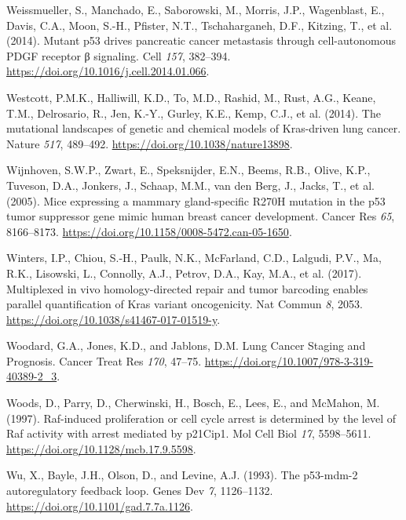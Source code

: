 \begin{CSLReferences}{0}{0}
\leavevmode{}%
Weissmueller, S., Manchado, E., Saborowski, M., Morris, J.P., Wagenblast, E., Davis, C.A., Moon, S.-H., Pfister, N.T., Tschaharganeh, D.F., Kitzing, T., et al. (2014). Mutant p53 drives pancreatic cancer metastasis through cell-autonomous PDGF receptor β signaling. Cell \emph{157}, 382--394. \url{https://doi.org/10.1016/j.cell.2014.01.066}.

\leavevmode{}%
Westcott, P.M.K., Halliwill, K.D., To, M.D., Rashid, M., Rust, A.G., Keane, T.M., Delrosario, R., Jen, K.-Y., Gurley, K.E., Kemp, C.J., et al. (2014). The mutational landscapes of genetic and chemical models of Kras-driven lung cancer. Nature \emph{517}, 489--492. \url{https://doi.org/10.1038/nature13898}.

\leavevmode{}%
Wijnhoven, S.W.P., Zwart, E., Speksnijder, E.N., Beems, R.B., Olive, K.P., Tuveson, D.A., Jonkers, J., Schaap, M.M., van den Berg, J., Jacks, T., et al. (2005). Mice expressing a mammary gland-specific R270H mutation in the p53 tumor suppressor gene mimic human breast cancer development. Cancer Res \emph{65}, 8166--8173. \url{https://doi.org/10.1158/0008-5472.can-05-1650}.

\leavevmode{}%
Winters, I.P., Chiou, S.-H., Paulk, N.K., McFarland, C.D., Lalgudi, P.V., Ma, R.K., Lisowski, L., Connolly, A.J., Petrov, D.A., Kay, M.A., et al. (2017). Multiplexed in vivo homology-directed repair and tumor barcoding enables parallel quantification of Kras variant oncogenicity. Nat Commun \emph{8}, 2053. \url{https://doi.org/10.1038/s41467-017-01519-y}.

\leavevmode{}%
Woodard, G.A., Jones, K.D., and Jablons, D.M. Lung Cancer Staging and Prognosis. Cancer Treat Res \emph{170}, 47--75. \url{https://doi.org/10.1007/978-3-319-40389-2_3}.

\leavevmode{}%
Woods, D., Parry, D., Cherwinski, H., Bosch, E., Lees, E., and McMahon, M. (1997). Raf-induced proliferation or cell cycle arrest is determined by the level of Raf activity with arrest mediated by p21Cip1. Mol Cell Biol \emph{17}, 5598--5611. \url{https://doi.org/10.1128/mcb.17.9.5598}.

\leavevmode{}%
Wu, X., Bayle, J.H., Olson, D., and Levine, A.J. (1993). The p53-mdm-2 autoregulatory feedback loop. Genes Dev \emph{7}, 1126--1132. \url{https://doi.org/10.1101/gad.7.7a.1126}.


\end{CSLReferences}
